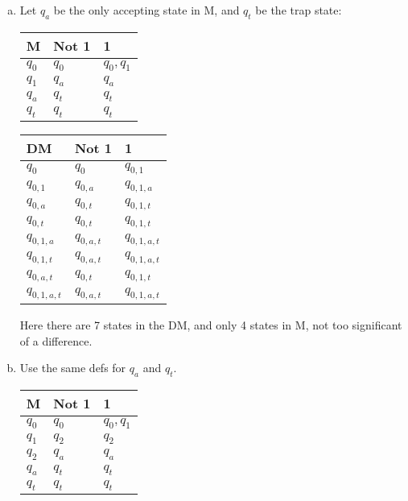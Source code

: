 \documentclass{article}
\begin{document}
\begin{enumerate}[(a)]
\vspace{1em}
\item
Let $q_a$ be the only accepting state in M, and $q_t$ be the trap state:

\vspace{6pt}

\begin{tabular}{l | l l}
M & Not 1 & 1 \\
\hline
$q_0$ & $q_0$ & $q_0,q_1$ \\
$q_1$ & $q_{a}$ & $q_{a}$\\
$q_{a}$ & $q_{t}$ & $q_{t}$ \\ 
$q_{t}$ & $q_{t}$ & $q_{t}$ \\
\end{tabular}

\vspace{6pt}

\begin{tabular}{l | l l}
DM & Not 1 & 1 \\
\hline
$q_0$ & $q_0$ & $q_{0,1}$ \\
$q_{0,1}$ & $q_{0,a}$ & $q_{0,1,a}$ \\
$q_{0,a}$ & $q_{0,t}$ & $q_{0,1,t}$ \\
$q_{0,t}$ & $q_{0,t}$ & $q_{0,1,t}$ \\
$q_{0,1,a}$ & $q_{0,a,t}$ & $q_{0,1,a,t}$ \\
$q_{0,1,t}$ & $q_{0,a,t}$ & $q_{0,1,a,t}$ \\
$q_{0,a,t}$ & $q_{0,t}$ & $q_{0,1,t}$ \\
$q_{0,1,a,t}$ & $q_{0,a,t}$ & $q_{0,1,a,t}$ \\
\end{tabular}

\vspace{6pt}

Here there are 7 states in the DM, and only 4 states in M, not too significant
of a difference.

\vspace{1em}

\item
Use the same defs for $q_a$ and $q_t$.

\vspace{6pt}

\begin{tabular}{l | l l}
M & Not 1 & 1 \\
\hline
$q_0$ & $q_0$ & $q_0,q_1$ \\
$q_1$ & $q_{2}$ & $q_{2}$\\
$q_2$ & $q_{a}$ & $q_{a}$\\
$q_{a}$ & $q_{t}$ & $q_{t}$ \\ 
$q_{t}$ & $q_{t}$ & $q_{t}$ \\
\end{tabular}


\end{enumerate}
\end{document}
